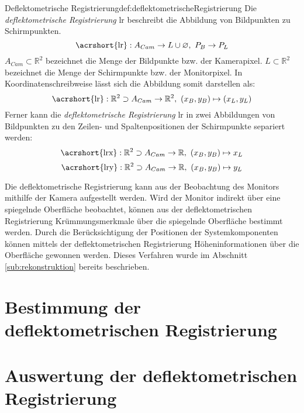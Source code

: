 \begin{Definition}{Deflektometrische Registrierung}{def:deflektometrischeRegistrierung}
	Die \textit{deflektometrische Registrierung} \acrshort{lr} beschreibt die Abbildung von Bildpunkten zu Schirmpunkten. \cite{kit_werling}
	\begin{equation}
		\text{\acrshort{lr}} : A_{Cam} \rightarrow L \cup \varnothing ,~ P_{B} \rightarrow P_{L}
	\end{equation}
	$ A_{Cam} \subset \mathbb{R}^{2} $ bezeichnet die Menge der Bildpunkte bzw. der Kamerapixel.
	$ L \subset \mathbb{R}^{2} $ bezeichnet die Menge der Schirmpunkte bzw. der Monitorpixel.
	In Koordinatenschreibweise lässt sich die Abbildung somit darstellen als:
	\begin{equation}\label{eq:deflektometrischeRegistrierungAbbildung}
		\text{\acrshort{lr}} : \mathbb{R}^{2} \supset A_{Cam} \rightarrow \mathbb{R}^2 ,~ (x_{B}, y_{B}) \mapsto (x_{L}, y_{L})
	\end{equation}
	Ferner kann die \textit{deflektometrische Registrierung} \acrshort{lr} in zwei Abbildungen von Bildpunkten zu den Zeilen- und Spaltenpositionen der Schirmpunkte separiert werden:
	\begin{equation}
		\text{\acrshort{lrx}} : \mathbb{R}^{2} \supset A_{Cam} \rightarrow \mathbb{R} ,~ (x_{B}, y_{B}) \mapsto x_{L}
	\end{equation}
	\begin{equation}
		\text{\acrshort{lry}} : \mathbb{R}^{2} \supset A_{Cam} \rightarrow \mathbb{R} ,~ (x_{B}, y_{B}) \mapsto y_{L}
	\end{equation}
\end{Definition}

\noindent
Die deflektometrische Registrierung kann aus der Beobachtung des Monitors mithilfe der Kamera aufgestellt werden.
Wird der Monitor indirekt über eine spiegelnde Oberfläche beobachtet, können aus der deflektometrischen Registrierung Krümmungsmerkmale über die spiegelnde Oberfläche bestimmt werden.
Durch die Berücksichtigung der Positionen der Systemkomponenten können mittels der deflektometrischen Registrierung Höheninformationen über die Oberfläche gewonnen werden.
Dieses Verfahren wurde im Abschnitt \ref{sub:rekonstruktion} bereits beschrieben.

{
	\FloatBarrier
    \section{Bestimmung der deflektometrischen Registrierung}
    \label{sec:bestimmungDeflektometrischeRegistrierung}
    
}

{
	\FloatBarrier
    \section{Auswertung der deflektometrischen Registrierung}
    \label{sec:auswertungDeflektometrischeRegistrierung}
    
}
